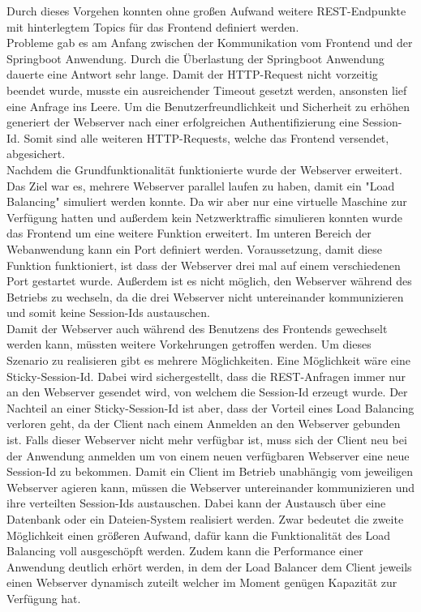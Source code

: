 Durch dieses Vorgehen konnten ohne großen Aufwand weitere REST-Endpunkte mit hinterlegtem Topics für das Frontend definiert werden. \\
Probleme gab es am Anfang zwischen der Kommunikation vom Frontend und der Springboot Anwendung. Durch die Überlastung der Springboot Anwendung dauerte eine Antwort sehr lange. Damit der HTTP-Request nicht vorzeitig beendet wurde, musste ein ausreichender Timeout gesetzt werden, ansonsten lief eine Anfrage ins Leere. Um die Benutzerfreundlichkeit und Sicherheit zu erhöhen generiert der Webserver nach einer erfolgreichen Authentifizierung eine Session-Id. Somit sind alle weiteren HTTP-Requests, welche das Frontend versendet, abgesichert. \\
Nachdem die Grundfunktionalität funktionierte wurde der Webserver erweitert. \\
Das Ziel war es, mehrere Webserver parallel laufen zu haben, damit ein "Load Balancing" simuliert werden konnte. Da wir aber nur eine virtuelle Maschine zur Verfügung hatten und außerdem kein Netzwerktraffic simulieren konnten wurde das Frontend um eine weitere Funktion erweitert.
Im unteren Bereich der Webanwendung kann ein Port definiert werden. Voraussetzung, damit diese Funktion funktioniert, ist dass der Webserver drei mal auf einem verschiedenen Port gestartet wurde. Außerdem ist es nicht möglich, den Webserver während des Betriebs zu wechseln, da die drei Webserver nicht untereinander kommunizieren und somit keine Session-Ids austauschen. \\
Damit der Webserver auch während des Benutzens des Frontends gewechselt werden kann, müssten weitere Vorkehrungen getroffen werden. Um dieses Szenario zu realisieren gibt es mehrere Möglichkeiten. 
Eine Möglichkeit wäre eine Sticky-Session-Id. Dabei wird sichergestellt, dass die REST-Anfragen immer nur an den Webserver gesendet wird, von welchem die Session-Id erzeugt wurde. Der Nachteil an einer Sticky-Session-Id ist aber, dass der Vorteil eines Load Balancing verloren geht, da der Client nach einem Anmelden an den Webserver gebunden ist. Falls dieser Webserver nicht mehr verfügbar ist, muss sich der Client neu bei der Anwendung anmelden um von einem neuen verfügbaren Webserver eine neue Session-Id zu bekommen.
Damit ein Client im Betrieb unabhängig vom jeweiligen Webserver agieren kann, müssen die Webserver untereinander kommunizieren und ihre verteilten Session-Ids austauschen. Dabei kann der Austausch über eine Datenbank oder ein Dateien-System realisiert werden. Zwar bedeutet die zweite Möglichkeit einen größeren Aufwand, dafür kann die Funktionalität des  Load Balancing voll ausgeschöpft werden. Zudem kann die Performance einer Anwendung deutlich erhört werden, in dem der Load Balancer dem Client jeweils einen Webserver dynamisch zuteilt welcher im Moment genügen Kapazität zur Verfügung hat.

